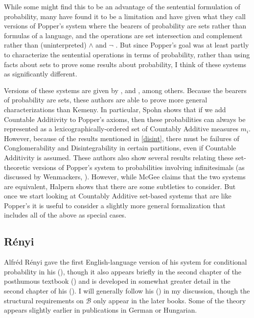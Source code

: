 While some might find this to be an advantage of the sentential formulation of probability, many have found it to be a limitation and have given what they call versions of Popper's system where the bearers of probability are sets rather than formulas of a language, and the operations are set intersection and complement rather than (uninterpreted) $\land$ and $\lnot$ \citep{randl, independence}. But since Popper's goal was at least partly to characterize the sentential operations in terms of probability, rather than using facts about sets to prove some results about probability, I think of these systems as significantly different.

Versions of these systems are given by \citet{fraassenrep,spohnrep,learnimp}, and \citet{halpern}, among others. Because the bearers of probability are sets, these authors are able to prove more general characterizations than Kemeny. In particular, Spohn shows that if we add Countable Additivity to Popper's axioms, then these probabilities can always be represented as a lexicographically-ordered set of Countably Additive measures $m_i$. However, because of the results mentioned in \autoref{disint}, there must be failures of Conglomerability and Disintegrability in certain partitions, even if Countable Additivity is assumed. These authors also show several results relating these set-theoretic versions of Popper's system to probabilities involving infinitesimals (as discussed by Wenmackers, ). However, while McGee claims that the two systems are equivalent, Halpern shows that there are some subtleties to consider. But once we start looking at Countably Additive set-based systems that are like Popper's it is useful to consider a slightly more general formalization that includes all of the above as special cases.

\subsection{R\'{e}nyi}\label{renyi}

Alfr\'{e}d R\'{e}nyi gave the first English-language version of his system for conditional probability in his (\citeyear{renyinew}), though it also appears briefly in the second chapter of the posthumous textbook (\citeyear{renyi}) and is developed in somewhat greater detail in the second chapter of his (\citeyear{renyiprob}). I will generally follow his (\citeyear{renyinew}) in my discussion, though the structural requirements on $\mathcal{B}$ only appear in the later books. Some of the theory appears slightly earlier in publications in German or Hungarian.

